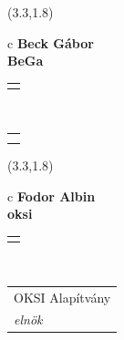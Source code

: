 \documentclass[11pt]{article}
\begin{document}
\makebox(3.3,1.8){
  \renewcommand\arraystretch{1.3}
  \begin{tabular}[c]{c}
    \hspace{8.5mm}
    \LARGE\bf{ Beck Gábor }\\
    \hspace{8.5mm}
    \Large{ BeGa }\\
    \renewcommand\arraystretch{3}
    \begin{tabular}[c]{c}
      \centering
      \fontfamily{phv}\selectfont{
        \textbf{
          \textsc{
            \scriptsize{
            \color{Dark}{ Ismerkedő }\color{Bright}{ Webmester }\color{Bright}{ Sminkmester }\color{Dark}{ Programozó }
            }
          }
        }
      }
    \end{tabular}
    \\
    \renewcommand\arraystretch{1}
    \begin{tabular}{p{3.3in}}
      \hspace{.7cm}\\
      \hspace{.7cm}\emph{  }\\
    \end{tabular}
  \end{tabular}
}

\makebox(3.3,1.8){
  \renewcommand\arraystretch{1.3}
  \begin{tabular}[c]{c}
    \hspace{8.5mm}
    \LARGE\bf{ Fodor Albin }\\
    \hspace{8.5mm}
    \Large{ oksi }\\
    \renewcommand\arraystretch{3}
    \begin{tabular}[c]{c}
      \centering
      \fontfamily{phv}\selectfont{
        \textbf{
          \textsc{
            \scriptsize{
            \color{Dark}{ Ismerkedő }\color{Bright}{ Webmester }\color{Bright}{ Sminkmester }\color{Bright}{ Programozó }
            }
          }
        }
      }
    \end{tabular}
    \\
    \renewcommand\arraystretch{1}
    \begin{tabular}{p{3.3in}}
      \hspace{.7cm}OKSI Alapítvány\\
      \hspace{.7cm}\emph{ elnök }\\
    \end{tabular}
  \end{tabular}
}
\end{document}
